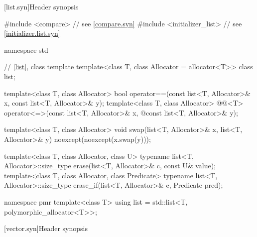 [list.syn]{Header  synopsis}

%
\begin{codeblock}
#include <compare>              // see \ref{compare.syn}
#include <initializer_list>     // see \ref{initializer.list.syn}

namespace std {
  // \ref{list}, class template 
  template<class T, class Allocator = allocator<T>> class list;

  template<class T, class Allocator>
    bool operator==(const list<T, Allocator>& x, const list<T, Allocator>& y);
  template<class T, class Allocator>
    @@<T> operator<=>(const list<T, Allocator>& x,
    @\itcorr@                                      const list<T, Allocator>& y);

  template<class T, class Allocator>
    void swap(list<T, Allocator>& x, list<T, Allocator>& y)
      noexcept(noexcept(x.swap(y)));

  template<class T, class Allocator, class U>
    typename list<T, Allocator>::size_type
      erase(list<T, Allocator>& c, const U& value);
  template<class T, class Allocator, class Predicate>
    typename list<T, Allocator>::size_type
      erase_if(list<T, Allocator>& c, Predicate pred);

  namespace pmr {
    template<class T>
      using list = std::list<T, polymorphic_allocator<T>>;
  }
}
\end{codeblock}

[vector.syn]{Header  synopsis}

